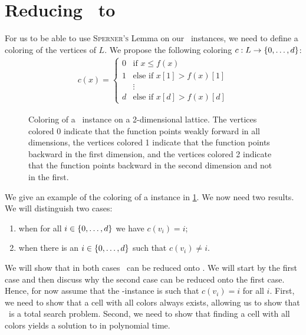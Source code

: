 \section{Reducing \Tarskistar\ to \Sperner}
\label{sec:tarskistar_to_sperner}

For us to be able to use \textsc{Sperner's} Lemma on our \Tarskistar\ instances, we need to define a coloring of the vertices of $L$. We propose the following coloring $c : L \rightarrow \left\{0, \dots, d\right\}$:
\begin{align*}
	c(x) =
	\begin{cases}
		0 & \text{if $x \leq f(x)$}         \\
		1 & \text{else if $x[1] > f(x)[1]$} \\
		  & \vdots                          \\
		d & \text{else if $x[d] > f(x)[d]$}
	\end{cases}
\end{align*}

\begin{figure}[ht]
	\centering
	\caption[Coloring of a \Tarskistar instance]{Coloring of a \Tarskistar\ instance on a 2-dimensional lattice. The vertices colored 0 indicate that the function points weakly forward in all dimensions, the vertices colored 1 indicate that the function points backward in the first dimension, and the vertices colored 2 indicate that the function points backward in the second dimension and not in the first.}
	\label{fig:tarskistar_coloring}
\end{figure}

We give an example of the coloring of a \Tarski instance in \cref{fig:tarskistar_coloring}. We now need two results. We will distinguish two cases:
\begin{enumerate}
    \item when for all $i \in \left\{0, \dots, d\right\}$ we have $c(v_i) = i$;
    \item when there is an $i \in \left\{0, \dots, d\right\}$ such that $c(v_i) \neq i$.
\end{enumerate}
We will show that in both cases \Tarskistar\ can be reduced onto \Sperner. We will start by the first case and then discuss why the second case can be reduced onto the first case. Hence, for now assume that the \Tarskistar-instance is such that $c(v_i) = i$ for all $i$. First, we need to show that a cell with all colors always exists, allowing us to show that \Tarskistar\ is a total search problem. Second, we need to show that finding a cell with all colors yields a solution to \Tarskistar in polynomial time.

